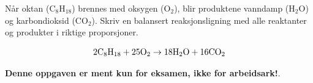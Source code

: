 

Når oktan (C$_{8}$H$_{18}$) brennes med oksygen (O$_{2}$), blir produktene vanndamp (H$_{2}$O) og karbondioksid (CO$_{2}$). Skriv en balansert reaksjonsligning med alle reaktanter og produkter i riktige proporsjoner.







$$\hbox{2C}_8\hbox{H}_{18} + \hbox{25O}_2 \to \hbox{18H}_2\hbox{O} + \hbox{16CO}_2$$







{\bf Denne oppgaven er ment kun for eksamen, ikke for arbeidsark!}.



